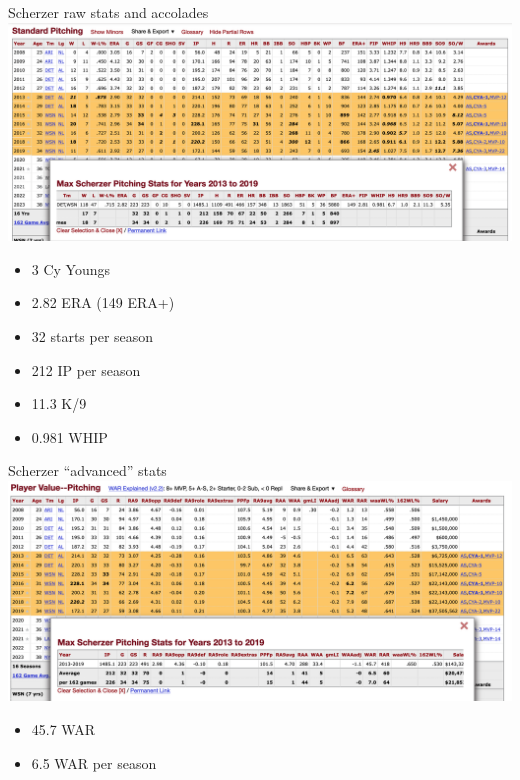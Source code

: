 \documentclass[
  ignorenonframetext,
]{beamer}
\providecommand{\tightlist}{%
  \setlength{\itemsep}{0pt}\setlength{\parskip}{0pt}}
\begin{document}
\begin{frame}{Scherzer raw stats and accolades}
\protect\hypertarget{scherzer-raw-stats-and-accolades}{}
\includegraphics{Scherzer_raw.png}

\begin{itemize}
\tightlist
\item
  3 Cy Youngs
\item
  2.82 ERA (149 ERA+)
\item
  32 starts per season
\item
  212 IP per season
\item
  11.3 K/9
\item
  0.981 WHIP
\end{itemize}
\end{frame}

\begin{frame}{Scherzer ``advanced'' stats}
\protect\hypertarget{scherzer-advanced-stats}{}
\includegraphics{Scherzer_advanced.png}

\begin{itemize}
\tightlist
\item
  45.7 WAR
\item
  6.5 WAR per season
\end{itemize}
\end{frame}
\end{document}
